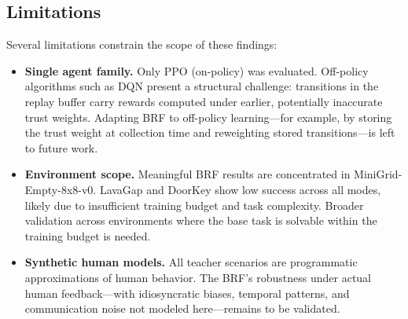 \documentclass[11pt]{article}
\begin{document}
\subsection{Limitations}

Several limitations constrain the scope of these findings:

\begin{itemize}
  \item \textbf{Single agent family.} Only PPO (on-policy) was evaluated.
        Off-policy algorithms such as DQN present a structural challenge:
        transitions in the replay buffer carry rewards computed under earlier,
        potentially inaccurate trust weights. Adapting BRF to off-policy
        learning---for example, by storing the trust weight at collection time
        and reweighting stored transitions---is left to future work.
  \item \textbf{Environment scope.} Meaningful BRF results are concentrated in
        MiniGrid-Empty-8x8-v0. LavaGap and DoorKey show low success across
        all modes, likely due to insufficient training budget and task
        complexity. Broader validation across environments where the base task
        is solvable within the training budget is needed.
  \item \textbf{Synthetic human models.} All teacher scenarios are programmatic
        approximations of human behavior. The BRF's robustness under actual
        human feedback---with idiosyncratic biases, temporal patterns, and
        communication noise not modeled here---remains to be validated.
\end{itemize}
\end{document}
